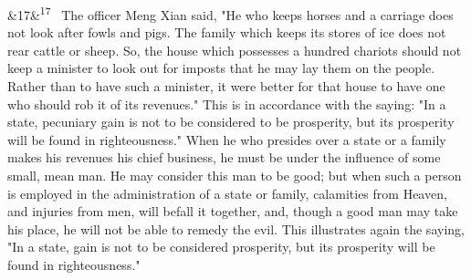 \documentclass[12pt]{article}
\newcommand{\para}[1][]{\par\noindent\ifx&#1&\else\textsuperscript{\footnotesize #1}~\fi}
\begin{document}
\para[17] The officer Meng Xian said, "He who keeps horses and a carriage does not look after fowls and pigs. The family which keeps its stores of ice does not rear cattle or sheep. So, the house which possesses a hundred chariots should not keep a minister to look out for imposts that he may lay them on the people. Rather than to have such a minister, it were better for that house to have one who should rob it of its revenues." This is in accordance with the saying: "In a state, pecuniary gain is not to be considered to be prosperity, but its prosperity will be found in righteousness." When he who presides over a state or a family makes his revenues his chief business, he must be under the influence of some small, mean man. He may consider this man to be good; but when such a person is employed in the administration of a state or family, calamities from Heaven, and injuries from men, will befall it together, and, though a good man may take his place, he will not be able to remedy the evil. This illustrates again the saying, "In a state, gain is not to be considered prosperity, but its prosperity will be found in righteousness."

\end{document}
